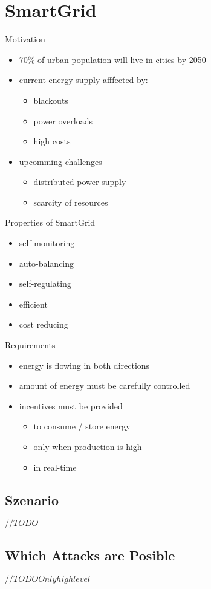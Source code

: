 \documentclass[a4paper, 12pt]{article}
\begin{document}
\section{SmartGrid}
Motivation
\begin{itemize}
\item 70\% of urban population will live in cities by 2050
\item current energy supply afffected by:
\begin{itemize}
\item blackouts
\item power overloads
\item high costs
\end{itemize}
\item upcomming challenges
\begin{itemize}
\item distributed power supply
\item scarcity of resources
\end{itemize}
\end{itemize}
Properties of SmartGrid
\begin{itemize}
\item self-monitoring
\item auto-balancing
\item self-regulating
\item efficient
\item cost reducing
\end{itemize}
Requirements
\begin{itemize}
\item energy is flowing in both directions
\item amount of energy must be carefully controlled
\item incentives must be provided
\begin{itemize}
\item to consume / store energy
\item only when production is high
\item in real-time
\end{itemize}
\end{itemize}

\subsection{Szenario}
$ //TODO $
\subsection{Which Attacks are Posible}
$ //TODO Only highlevel$
\end{document}
